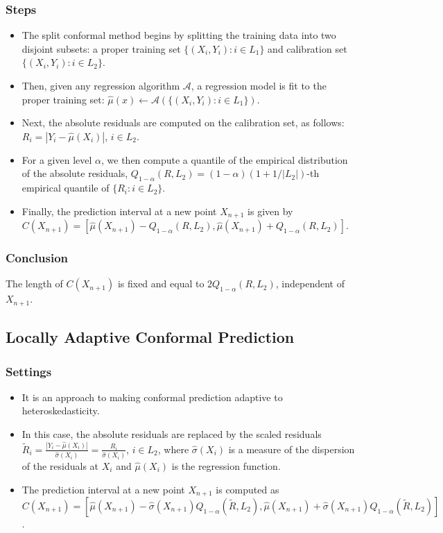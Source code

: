 \documentclass[11pt,a4paper]{article}
\begin{document}
\subsubsection{Steps}
\begin{itemize}
    \item The split conformal method begins by splitting the training data into two disjoint subsets: a proper training set $\{(X_i, Y_i) : i \in L_1\}$ and calibration set $\{(X_i, Y_i) : i \in L_2\}$.
    \item Then, given any regression algorithm $\mathcal{A}$, a regression model is fit to the proper training set: $\hat{\mu}(x) \leftarrow \mathcal{A}(\{(X_i, Y_i) : i \in L_1\})$.
    \item Next, the absolute residuals are computed on the calibration set, as follows: $R_i = |Y_i - \hat{\mu}(X_i)|$, $i \in L_2$.
    \item For a given level $\alpha$, we then compute a quantile of the empirical distribution of the absolute residuals, $Q_{1-\alpha}(R, L_2) = (1 - \alpha)(1 + 1/|L_2|)$-th empirical quantile of $\{R_i : i \in L_2\}$.
    \item Finally, the prediction interval at a new point $X_{n+1}$ is given by $C(X_{n+1}) = [\hat{\mu}(X_{n+1}) - Q_{1-\alpha}(R, L_2), \hat{\mu}(X_{n+1}) + Q_{1-\alpha}(R, L_2)]$.
\end{itemize}

\subsubsection{Conclusion}
The length of $C(X_{n+1})$ is fixed and equal to $2Q_{1-\alpha}(R, L_2)$, independent of $X_{n+1}$.

\subsection{Locally Adaptive Conformal Prediction}
\subsubsection{Settings}
\begin{itemize}
    \item It is an approach to making conformal prediction adaptive to heteroskedasticity.
    \item In this case, the absolute residuals are replaced by the scaled residuals $\tilde{R}_i = \frac{|Y_i - \hat{\mu}(X_i)|}{\hat{\sigma}(X_i)} = \frac{R_i}{\hat{\sigma}(X_i)}$, $i \in L_2$, where $\hat{\sigma}(X_i)$ is a measure of the dispersion of the residuals at $X_i$ and $\hat{\mu}(X_i)$ is the regression function.
    \item The prediction interval at a new point $X_{n+1}$ is computed as $C(X_{n+1}) = [\hat{\mu}(X_{n+1}) - \hat{\sigma}(X_{n+1})Q_{1-\alpha}(\tilde{R}, L_2), \hat{\mu}(X_{n+1}) + \hat{\sigma}(X_{n+1})Q_{1-\alpha}(\tilde{R}, L_2)]$.
\end{itemize}
\end{document}
